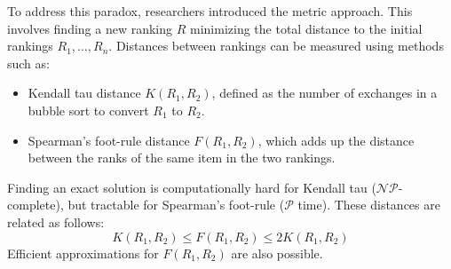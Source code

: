 To address this paradox, researchers introduced the metric approach.
This involves finding a new ranking $R$ minimizing the total distance to the initial rankings $R_1,\dots,R_n$.
Distances between rankings can be measured using methods such as: 
\begin{itemize}
    \item Kendall tau distance $K(R_1, R_2)$, defined as the number of exchanges in a bubble sort to convert $R_1$ to $R_2$. 
    \item Spearman's foot-rule distance $F(R_1, R_2)$, which adds up the distance between the ranks of the same item in the two rankings. 
\end{itemize}
Finding an exact solution is computationally hard for Kendall tau ($\mathcal{NP}$-complete), but tractable for Spearman's foot-rule ($\mathcal{P}$ time). 
These distances are related as follows:
\[K(R_1, R_2) \leq F(R_1, R_2) \leq 2K(R_1, R_2)\]
Efficient approximations for $F(R_1, R_2)$ are also possible.